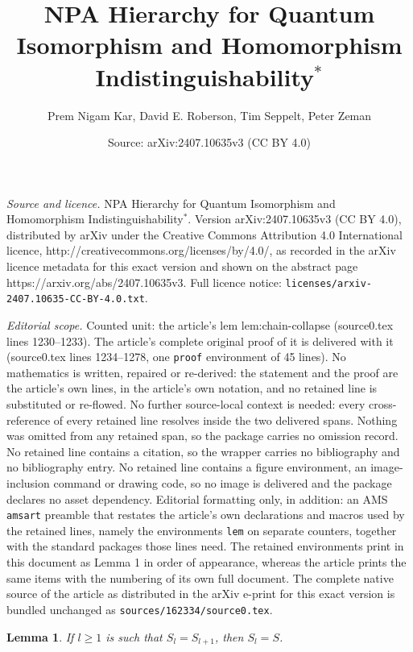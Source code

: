 \documentclass[10pt,a4paper]{amsart}
\title{NPA Hierarchy for Quantum Isomorphism and\texorpdfstring{\newline}{ } Homomorphism Indistinguishability$^{*}$}
\author{Prem Nigam Kar, David E. Roberson, Tim Seppelt, Peter Zeman}
\date{Source: arXiv:2407.10635v3 (CC BY 4.0)}
\newtheorem{lem}{Lemma}
\begin{document}
\maketitle

\noindent\emph{Source and licence.} NPA Hierarchy for Quantum Isomorphism and\texorpdfstring{\newline}{ } Homomorphism Indistinguishability$^{*}$. Version arXiv:2407.10635v3 (CC BY 4.0), distributed by arXiv under the Creative Commons Attribution 4.0 International licence, http://creativecommons.org/licenses/by/4.0/, as recorded in the arXiv licence metadata for this exact version and shown on the abstract page https://arxiv.org/abs/2407.10635v3. Full licence notice: \texttt{licenses/arxiv-2407.10635-CC-BY-4.0.txt}.\par\smallskip

\noindent\textit{Editorial scope.} Counted unit: the article's lem lem:chain-collapse (source0.tex lines 1230--1233). The article's complete original proof of it is delivered with it (source0.tex lines 1234--1278, one \texttt{proof} environment of 45 lines). No mathematics is written, repaired or re-derived: the statement and the proof are the article's own lines, in the article's own notation, and no retained line is substituted or re-flowed.  No further source-local context is needed: every cross-reference of every retained line resolves inside the two delivered spans.  Nothing was omitted from any retained span, so the package carries no omission record.  No retained line contains a citation, so the wrapper carries no bibliography and no bibliography entry.  No retained line contains a figure environment, an image-inclusion command or drawing code, so no image is delivered and the package declares no asset dependency.  Editorial formatting only, in addition: an AMS \texttt{amsart} preamble that restates the article's own declarations and macros used by the retained lines, namely the environments \texttt{lem} on separate counters, together with the standard packages those lines need.  The retained environments print in this document as Lemma 1 in order of appearance, whereas the article prints the same items with the numbering of its own full document.  The complete native source of the article as distributed in the arXiv e-print for this exact version is bundled unchanged as \texttt{sources/162334/source0.tex}.
\begin{lem} \label{lem:chain-collapse}
	If $l \geq 1$ is such that $S_l = S_{l+1}$,
	then $S_l = S$.
\end{lem}
\end{document}
